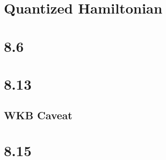 \section*{Quantized Hamiltonian}

\section*{8.6}

\section*{8.13}

\subsection*{WKB Caveat}

\section*{8.15}
